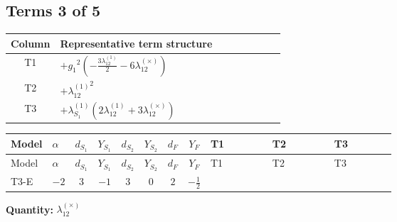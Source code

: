 \documentclass[8pt]{article}
\begin{document}
\begin{landscape}
\subsection*{Terms 3 of 5}
\begin{center}
\begin{tabular}{@{}c >{\raggedright\arraybackslash}p{0.82\linewidth}@{}}
\toprule
Column & Representative term structure \\
\midrule
T1 & \(\displaystyle +{g_1}^2 \left(-\frac{3 {\lambda_{12}^{(1)}}}{2}-6 {\lambda_{12}^{(\times)}}\right)\) \\
\midrule
T2 & \(\displaystyle +{\lambda_{12}^{(1)}}^2\) \\
\midrule
T3 & \(\displaystyle +{\lambda_{S_1}^{(1)}} (2 {\lambda_{12}^{(1)}}+3 {\lambda_{12}^{(\times)}})\) \\
\midrule
\bottomrule
\end{tabular}
\end{center}
\smallskip
\tiny
\begin{longtable}{@{}llcccccc >{\raggedright\arraybackslash}p{0.21\linewidth} >{\raggedright\arraybackslash}p{0.21\linewidth} >{\raggedright\arraybackslash}p{0.21\linewidth}@{}}
\toprule
Model & $\alpha$ & $d_{S_1}$ & $Y_{S_1}$ & $d_{S_2}$ & $Y_{S_2}$ & $d_F$ & $Y_F$ & T1 & T2 & T3 \\
\midrule
\endfirsthead
\toprule
Model & $\alpha$ & $d_{S_1}$ & $Y_{S_1}$ & $d_{S_2}$ & $Y_{S_2}$ & $d_F$ & $Y_F$ & T1 & T2 & T3 \\
\midrule
\endhead
T3-E & $-2$ & $3$ & $-1$ & $3$ & $0$ & $2$ & $-\frac{1}{2}$ & \scriptsize\adjustbox{max width=\linewidth}{$\begin{gathered} +{g_1}^2 \left(-\frac{3 {\lambda_{12}^{(1)}}}{2}-6 {\lambda_{12}^{(\times)}}\right)\end{gathered}$} & \scriptsize\adjustbox{max width=\linewidth}{$\begin{gathered} +{\lambda_{12}^{(1)}}^2\end{gathered}$} & \scriptsize\adjustbox{max width=\linewidth}{$\begin{gathered} +{\lambda_{S_1}^{(1)}} (2 {\lambda_{12}^{(1)}}+3 {\lambda_{12}^{(\times)}})\end{gathered}$} \\
\midrule
\bottomrule
\end{longtable}
\clearpage
\noindent\textbf{Quantity: }$\lambda_{12}^{(\times)}$\par\smallskip

\end{landscape}
\end{document}
